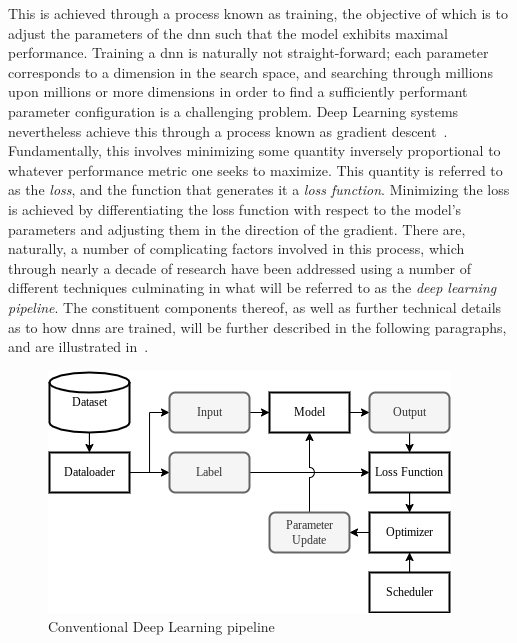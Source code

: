     This is achieved through a process known as training, the objective of which is to adjust the parameters of the \gls{dnn} such that the model exhibits maximal performance. Training a \gls{dnn} is naturally not straight-forward; each parameter corresponds to a dimension in the search space, and searching through millions upon millions or more dimensions in order to find a sufficiently performant parameter configuration is a challenging problem. Deep Learning systems nevertheless achieve this through a process known as gradient descent~\cite{gradient_descent_overview}. Fundamentally, this involves minimizing some quantity inversely proportional to whatever performance metric one seeks to maximize. This quantity is referred to as the \textit{loss}, and the function that generates it a \textit{loss function}. Minimizing the loss is achieved by differentiating the loss function with respect to the model's parameters and adjusting them in the direction of the gradient. There are, naturally, a number of complicating factors involved in this process, which through nearly a decade of research have been addressed using a number of different techniques culminating in what will be referred to as the \textit{deep learning pipeline}. The constituent components thereof, as well as further technical details as to how \glspl{dnn} are trained, will be further described in the following paragraphs, and are illustrated in~. 
    
    \begin{figure}[h]
        \centering
        \includegraphics[width=0.75\linewidth]{illustrations/pipeline.png}
        \caption{Conventional Deep Learning pipeline}
        \label{fig:pipeline}
    \end{figure}
    

